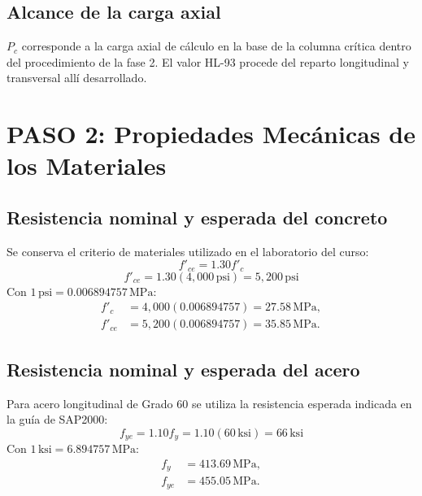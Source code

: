 \documentclass[11pt,a4paper]{article}
\begin{document}
\subsection*{Alcance de la carga axial}

$P_c$ corresponde a la carga axial de cálculo en la base de la columna crítica dentro del procedimiento de la fase 2. El valor HL-93 procede del reparto longitudinal y transversal allí desarrollado.



\section{PASO 2: Propiedades Mecánicas de los Materiales}

\subsection{Resistencia nominal y esperada del concreto}
Se conserva el criterio de materiales utilizado en el laboratorio del curso:
\begin{equation*}
f'_{ce}=1.30f'_c
\end{equation*}
\begin{equation*}
f'_{ce}=1.30(4{,}000\,\mathrm{psi})=\boxed{5{,}200\,\mathrm{psi}}
\end{equation*}
Con $1\,\mathrm{psi}=0.006894757\,\mathrm{MPa}$:
\begin{align*}
f'_c&=4{,}000(0.006894757)=27.58\,\mathrm{MPa},\\
f'_{ce}&=5{,}200(0.006894757)=35.85\,\mathrm{MPa}.
\end{align*}

\subsection{Resistencia nominal y esperada del acero}
Para acero longitudinal de Grado 60 se utiliza la resistencia esperada
indicada en la guía de SAP2000:
\begin{equation*}
f_{ye}=1.10f_y=1.10(60\,\mathrm{ksi})=\boxed{66\,\mathrm{ksi}}
\end{equation*}
Con $1\,\mathrm{ksi}=6.894757\,\mathrm{MPa}$:
\begin{align*}
f_y&=413.69\,\mathrm{MPa},\\
f_{ye}&=455.05\,\mathrm{MPa}.
\end{align*}
\end{document}
